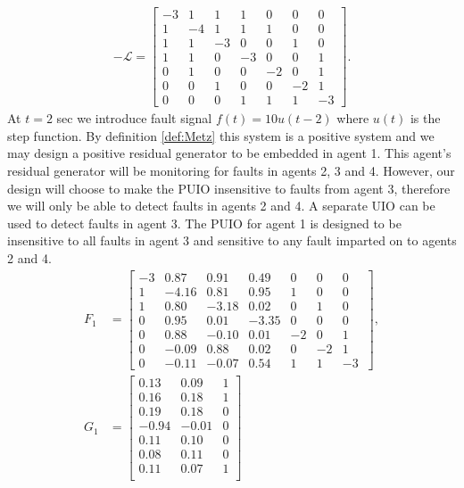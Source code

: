 \documentclass[letterpaper, 10 pt, conference]{ieeeconf}  %
\def\cL{\mathcal{L}}
\begin{document}
\begin{align*}
-\cL = \left [\begin{array}{ccccccc}
 -3&	1&     1&     1&     0&     0&     0 \\
 1&    -4&     1&     1&     1&     0&     0 \\
     1&     1&    -3&     0&     0&     1&     0 \\
     1&     1&     0&    -3&     0&     0&     1 \\
     0&     1&     0&     0&    -2&     0&     1 \\
     0&     0&     1&     0&     0&    -2&     1 \\
     0&     0&     0&     1&     1&     1&    -3
\end{array} \right ].
\end{align*}\endgroup
At $t=2$ sec we introduce fault signal $f(t) = 10u(t-2)$ where $u(t)$ is the step function. By definition \ref{def:Metz} this system is a positive system and we may design a positive residual generator to be embedded in agent 1. This agent's residual generator will be monitoring for faults in agents 2, 3 and 4. However, our design will choose to make the PUIO insensitive to faults from agent 3, therefore we will only be able to detect faults in agents 2 and 4. A separate UIO can be used to detect faults in agent 3. The PUIO for agent 1 is designed to be insensitive to all faults in agent 3 and sensitive to any fault imparted on to agents 2 and 4. %
\begingroup\makeatletter\def\f@size{5}\check@mathfonts
\def\maketag@@@#1{\hbox{\m@th\large\normalfont#1}}%
\begin{align*}
F_1 &= \left [\begin{array}{ccccccc}
 -3&    0.87&    0.91&    0.49&         0&         0&         0 \\
    1&   -4.16&  0.81&    0.95&    1&         0&         0 \\
    1&    0.80&   -3.18&    0.02&         0&    1&         0\\
         0&    0.95&    0.01&   -3.35&         0&         0&         0\\
         0&    0.88&   -0.10&    0.01&   -2&         0&    1\\
         0&   -0.09&    0.88&    0.02&         0&   -2&    1\\
         0&   -0.11&   -0.07&    0.54&    1&    1&   -3\
\end{array} \right ],\\
G_1 &= \left [\begin{array}{ccccccc}
  0.13&    0.09&    1\\
    0.16&    0.18&    1\\
    0.19&    0.18&         0\\
   -0.94&   -0.01&         0\\
    0.11&    0.10&         0\\
    0.08&    0.11&         0\\
    0.11&    0.07&    1\\
\end{array} \right ]
\end{align*}\endgroup
\end{document}
